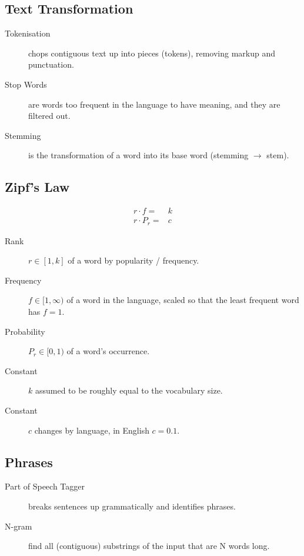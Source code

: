 \documentclass[landscape]{cheat}
\begin{document}
\begin{multicols*}{3}
\subsection{Text Transformation}
\begin{description}
    \item[Tokenisation] chops contiguous text up into pieces (tokens), removing markup and punctuation.
    \item[Stop Words] are words too frequent in the language to have meaning, and they are filtered out.
    \item[Stemming] is the transformation of a word into its base word (stemming $\rightarrow$ stem).
\end{description}

\subsection{Zipf's Law}
\begin{align*}
    r\cdot f =& k \\
    r\cdot P_r =& c
\end{align*}
\begin{description}
    \item[Rank] $r \in [1, k]$ of a word by popularity / frequency.
    \item[Frequency] $f \in [1, \infty)$ of a word in the language, scaled so that the least frequent word has $f=1$.
    \item[Probability] $P_r \in [0, 1)$ of a word's occurrence.
    \item[Constant] $k$ assumed to be roughly equal to the vocabulary size.
    \item[Constant] $c$ changes by language, in English $c=0.1$.
\end{description}

\subsection{Phrases}
\begin{description}
    \item[Part of Speech Tagger] breaks sentences up grammatically and identifies phrases.
    \item[N-gram] find all (contiguous) substrings of the input that are N words long.
\end{description}


\end{multicols*}
\end{document}

